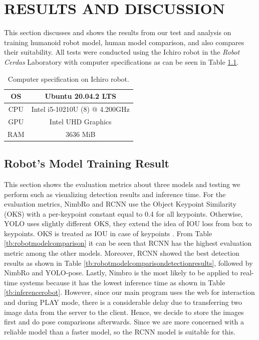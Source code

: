 \chapter{RESULTS AND DISCUSSION}
\label{chap:resultsandiscussion}


This section discusses and shows the results from our test and analysis on training humanoid robot model, human model comparison, and also compares their suitability.
All tests were conducted using the Ichiro robot in the \emph{Robot Cerdas} Laboratory with computer specifications as can be seen in Table \ref{tb:computerspecichiro}.

\def\arraystretch{1.5}
\begin{longtable}{|c|c|}
  \caption{Computer specification on Ichiro robot.}
  \label{tb:computerspecichiro}\\
  \hline
  OS      & Ubuntu 20.04.2 LTS \\
  \hline
  CPU     & Intel i5-10210U (8) @ 4.200GHz \\
  \hline
  GPU     & Intel UHD Graphics  \\
  \hline
  RAM     & 3636 MiB \\
  \hline
\end{longtable}

\section{Robot's Model Training Result}
\label{sec:robotmodeltrainingresult}

This section shows the evaluation metrics about three models and testing we perform such as visualizing detection results and inference time.
For the evaluation metrics, NimbRo and RCNN use the Object Keypoint Similarity (OKS) with a per-keypoint constant equal to 0.4 for all keypoints.
Otherwise, YOLO uses slightly different OKS, they extend the idea of IOU loss from box to keypoints. OKS is treated as IOU in case of keypoints \parencite{maji2022yolopose}.
From Table \ref{tb:robotmodelcomparison} it can be seen that RCNN has the highest evaluation metric among the other models.
Moreover, RCNN showed the best detection results as shown in Table \ref{tb:robotmodelcomparisondetectionresults}, followed by NimbRo and YOLO-pose.
Lastly, Nimbro is the most likely to be applied to real-time systems because it has the lowest inference time as shown in Table \ref{tb:inferencerobot}.
However, since our main program uses the web for interaction and during PLAY mode, there is a considerable delay due to transferring two image data from the server to the client.
Hence, we decide to store the images first and do pose comparisons afterwards. Since we are more concerned with a reliable model than a faster model, so the RCNN model is suitable for this.

